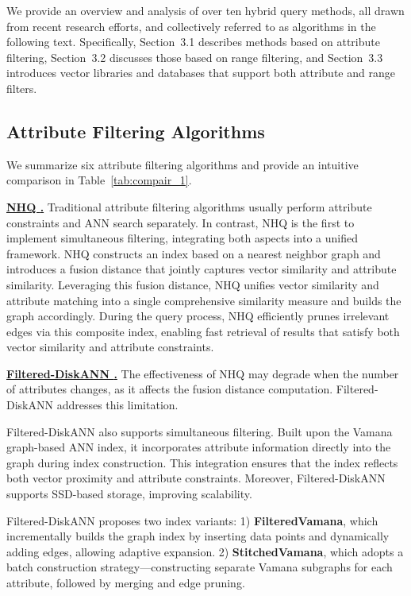 \documentclass[sigconf, nonacm]{acmart}
\begin{document}
\begin{sloppypar}
We provide an overview and analysis of over ten hybrid query methods, all drawn from recent research efforts, and collectively referred to as algorithms in the following text. Specifically, Section~3.1 describes methods based on attribute filtering, Section~3.2 discusses those based on range filtering, and Section~3.3 introduces vector libraries and databases that support both attribute and range filters.

\vspace{-10pt}
\subsection{Attribute Filtering Algorithms}

We summarize six attribute filtering algorithms and provide an intuitive comparison in Table~\ref{tab:compair_1}.

\vspace{1em}
\noindent\textbf{\underline{NHQ \cite{NHQ}.}}  
Traditional attribute filtering algorithms usually perform attribute constraints and ANN search separately. In contrast, NHQ is the first to implement simultaneous filtering, integrating both aspects into a unified framework. NHQ constructs an index based on a nearest neighbor graph and introduces a fusion distance that jointly captures vector similarity and attribute similarity. Leveraging this fusion distance, NHQ unifies vector similarity and attribute matching into a single comprehensive similarity measure and builds the graph accordingly. During the query process, NHQ efficiently prunes irrelevant edges via this composite index, enabling fast retrieval of results that satisfy both vector similarity and attribute constraints.

\vspace{1em}
\noindent\textbf{\underline{Filtered-DiskANN \cite{Filtered-diskann}.}}  
The effectiveness of NHQ may degrade when the number of attributes changes, as it affects the fusion distance computation. Filtered-DiskANN addresses this limitation.

Filtered-DiskANN also supports simultaneous filtering. Built upon the Vamana \cite{diskann} graph-based ANN index, it incorporates attribute information directly into the graph during index construction. This integration ensures that the index reflects both vector proximity and attribute constraints. Moreover, Filtered-DiskANN supports SSD-based storage, improving scalability.

Filtered-DiskANN proposes two index variants:  
1) \textbf{FilteredVamana}, which incrementally builds the graph index by inserting data points and dynamically adding edges, allowing adaptive expansion.  
2) \textbf{StitchedVamana}, which adopts a batch construction strategy—constructing separate Vamana subgraphs for each attribute, followed by merging and edge pruning.


\end{sloppypar}
\end{document}

